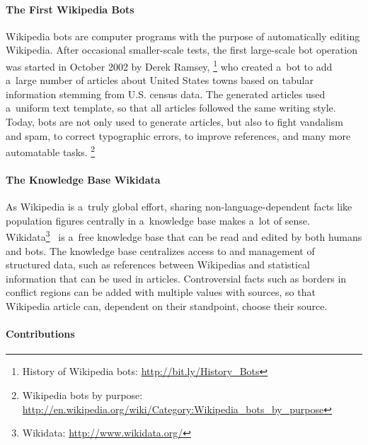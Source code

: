 \documentclass{sig-alternate}
\newcommand{\inlinelistingsize}{\fontsize{8pt}{11pt}}
\let\oldurl\url
\renewcommand{\url}[1]{\inlinelistingsize\oldurl{#1}}
\begin{document}
\paragraph{The First Wikipedia Bots}

Wikipedia bots are computer programs
with the purpose of automatically editing Wikipedia.
After occasional smaller-scale tests,
the first large-scale bot operation
was started in October 2002 by Derek Ramsey,%
\footnote{History of Wikipedia bots:
\url{http://bit.ly/History_Bots}}
who created a~bot to add a~large number
of articles about United States towns
based on tabular information
stemming from U.S. census data.
The generated articles used a~uniform
text template, so that all articles
followed the same writing style.
Today, bots are not only used to generate articles,
but also to fight vandalism and spam,
to correct typographic errors,
to improve references, and many more automatable tasks.%
\footnote{Wikipedia bots by purpose: \url{http://en.wikipedia.org/wiki/Category:Wikipedia_bots_by_purpose}}

\paragraph{The Knowledge Base Wikidata}

As Wikipedia is a~truly global effort,
sharing non-language-dependent facts
like population figures centrally
in a~knowledge base makes a~lot of sense.
Wikidata\footnote{Wikidata: \url{http://www.wikidata.org/}}~\cite{vrandecic2012wikidata}
is a~free knowledge base that can be read
and edited by both humans and bots.
The knowledge base centralizes access to
and management of structured data,
such as references between Wikipedias
and statistical information that can be used in articles.
Controversial facts such as borders in conflict regions
can be added with multiple values with sources,
so that Wikipedia article can,
dependent on their standpoint, choose their source.

\paragraph{Contributions}
\end{document}
